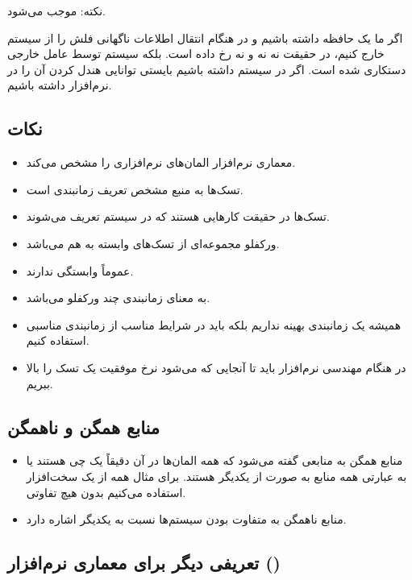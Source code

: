 نکته:  موجب  می‌شود.

اگر ما یک حافظه  داشته باشیم و در هنگام انتقال اطلاعات ناگهانی فلش را از
سیستم خارج کنیم، در حقیقت نه  نه  و نه  رخ داده
است. بلکه سیستم توسط عامل خارجی دستکاری شده است. اگر  در سیستم داشته
باشیم بایستی توانایی هندل کردن آن را در نرم‌افزار داشته باشیم.

\subsection*{نکات}

\begin{itemize}
    \item معماری نرم‌افزار المان‌های نرم‌افزاری را مشخص می‌کند.
    \item {} تسک‌ها به منبع مشخص تعریف زمانبندی است.
    \item تسک‌ها در حقیقت کار‌هایی هستند که در سیستم تعریف می‌شوند.
    \item ورکفلو مجموعه‌ای از تسک‌های وابسته به هم می‌باشد.
    \item {} عموماً وابستگی ندارند.
    \item {} به معنای زمانبندی چند ورکفلو
    می‌باشد.
    \item همیشه یک زمانبندی بهینه نداریم بلکه باید در شرایط مناسب از زمانبندی
    مناسبی استفاده کنیم.
    \item در هنگام مهندسی نرم‌افزار باید تا آنجایی که می‌شود نرخ موفقیت یک تسک
    را بالا ببریم.
\end{itemize}

\subsection{منابع همگن و ناهمگن}

\begin{itemize}
    \item منابع همگن به منابعی گفته می‌شود که همه المان‌ها در آن دقیقاً یک چی
    هستند یا به عبارتی همه منابع به صورت  از یکدیگر هستند. برای مثال
    همه از یک سخت‌افزار استفاده می‌کنیم بدون هیچ تفاوتی.
    \item منابع ناهمگن به متفاوت بودن سیستم‌ها نسبت به یکدیگر اشاره دارد.
\end{itemize}

\subsection{تعریفی دیگر برای معماری نرم‌افزار ()}

